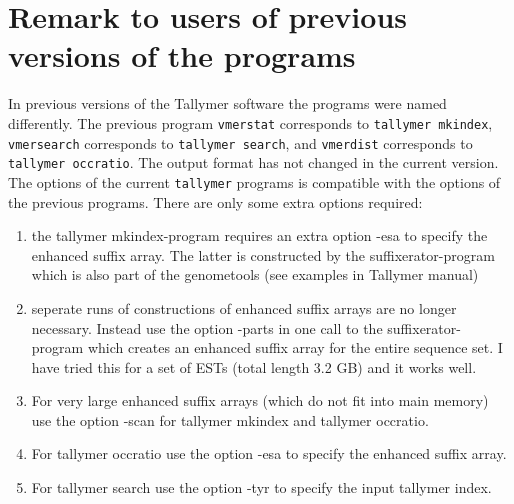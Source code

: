 \documentclass[12pt]{article}
\newcommand{\Programname}[1]{\texttt{\small #1}}
\newcommand{\Tallymer}[0]{\Programname{tallymer}\xspace}
\begin{document}
\section{Remark to users of previous versions of the programs}
In previous versions of the Tallymer software the programs were 
named differently. The previous program \texttt{vmerstat}
corresponds to \texttt{tallymer mkindex}, \texttt{vmersearch}
corresponds to \texttt{tallymer search}, and \texttt{vmerdist}
corresponds to \texttt{tallymer occratio}. The output format
has not changed in the current version. The options of the
current \Tallymer programs is compatible with the options of the
previous programs. There are only some extra options required:
\begin{enumerate}
\item
the tallymer mkindex-program requires an extra option -esa to
specify the enhanced suffix array. The latter is
constructed by the suffixerator-program which is also part
of the genometools (see examples in Tallymer manual)
\item
seperate runs of constructions of enhanced suffix arrays are no
longer necessary. Instead use the option -parts in one
call to the suffixerator-program which creates an enhanced suffix array
for the entire sequence set. I have tried this for a set of
ESTs (total length 3.2 GB) and it works well.
\item
For very large enhanced suffix arrays (which do not fit into main
memory) use the option -scan for tallymer mkindex and tallymer occratio.
\item 
For tallymer occratio use the option -esa to specify the enhanced suffix
array.
\item
For tallymer search use the option -tyr to specify the input tallymer
index.
\end{enumerate}
\end{document}
